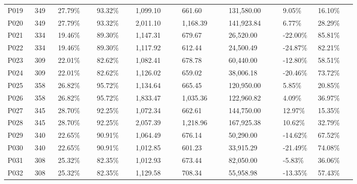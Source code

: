 \begin{longtable}{@{}p{0.07\linewidth}p{0.06\linewidth}p{0.1\linewidth}p{0.1\linewidth}p{0.12\linewidth}p{0.12\linewidth}p{0.14\linewidth}p{0.09\linewidth}p{0.1\linewidth}@{}}
P019 & 349 & 27.79\% & 93.32\% & 1,099.10 & 661.60 & 131,580.00 & 9.05\% & 16.10\% \\
P020 & 349 & 27.79\% & 93.32\% & 2,011.10 & 1,168.39 & 141,923.84 & 6.77\% & 28.29\% \\
P021 & 334 & 19.46\% & 89.30\% & 1,147.31 & 679.67 & 26,520.00 & -22.00\% & 85.81\% \\
P022 & 334 & 19.46\% & 89.30\% & 1,117.92 & 612.44 & 24,500.49 & -24.87\% & 82.21\% \\
P023 & 309 & 22.01\% & 82.62\% & 1,082.41 & 678.78 & 60,440.00 & -12.80\% & 58.51\% \\
P024 & 309 & 22.01\% & 82.62\% & 1,126.02 & 659.02 & 38,006.18 & -20.46\% & 73.72\% \\
P025 & 358 & 26.82\% & 95.72\% & 1,134.64 & 665.45 & 120,950.00 & 5.85\% & 20.85\% \\
P026 & 358 & 26.82\% & 95.72\% & 1,833.47 & 1,035.36 & 122,960.82 & 4.09\% & 36.97\% \\
P027 & 345 & 28.70\% & 92.25\% & 1,072.34 & 662.61 & 144,750.00 & 12.97\% & 15.35\% \\
P028 & 345 & 28.70\% & 92.25\% & 2,057.39 & 1,218.96 & 167,925.38 & 10.62\% & 32.79\% \\
P029 & 340 & 22.65\% & 90.91\% & 1,064.49 & 676.14 & 50,290.00 & -14.62\% & 67.52\% \\
P030 & 340 & 22.65\% & 90.91\% & 1,012.85 & 601.23 & 33,915.29 & -21.49\% & 74.08\% \\
P031 & 308 & 25.32\% & 82.35\% & 1,012.93 & 673.44 & 82,050.00 & -5.83\% & 36.06\% \\
P032 & 308 & 25.32\% & 82.35\% & 1,129.58 & 708.34 & 55,958.98 & -13.35\% & 57.43\% \\
\bottomrule
\end{longtable}
